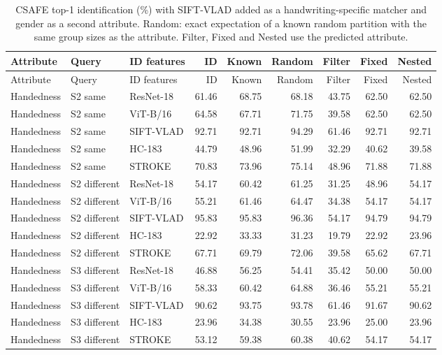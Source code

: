 \begin{longtable}{lllrrrrrr}
\caption{CSAFE top-1 identification (\%) with SIFT-VLAD added as a handwriting-specific matcher and gender as a second attribute. Random: exact expectation of a known random partition with the same group sizes as the attribute. Filter, Fixed and Nested use the predicted attribute.}\label{tab:p2ident}\\
\toprule Attribute & Query & ID features & ID & Known & Random & Filter & Fixed & Nested\\\midrule
\endfirsthead
\toprule Attribute & Query & ID features & ID & Known & Random & Filter & Fixed & Nested\\\midrule
\endhead
Handedness & S2 same & ResNet-18 & 61.46 & 68.75 & 68.18 & 43.75 & 62.50 & 62.50 \\
Handedness & S2 same & ViT-B/16 & 64.58 & 67.71 & 71.75 & 39.58 & 62.50 & 62.50 \\
Handedness & S2 same & SIFT-VLAD & 92.71 & 92.71 & 94.29 & 61.46 & 92.71 & 92.71 \\
Handedness & S2 same & HC-183 & 44.79 & 48.96 & 51.99 & 32.29 & 40.62 & 39.58 \\
Handedness & S2 same & STROKE & 70.83 & 73.96 & 75.14 & 48.96 & 71.88 & 71.88 \\
Handedness & S2 different & ResNet-18 & 54.17 & 60.42 & 61.25 & 31.25 & 48.96 & 54.17 \\
Handedness & S2 different & ViT-B/16 & 55.21 & 61.46 & 64.47 & 34.38 & 54.17 & 54.17 \\
Handedness & S2 different & SIFT-VLAD & 95.83 & 95.83 & 96.36 & 54.17 & 94.79 & 94.79 \\
Handedness & S2 different & HC-183 & 22.92 & 33.33 & 31.23 & 19.79 & 22.92 & 23.96 \\
Handedness & S2 different & STROKE & 67.71 & 69.79 & 72.06 & 39.58 & 65.62 & 67.71 \\
Handedness & S3 different & ResNet-18 & 46.88 & 56.25 & 54.41 & 35.42 & 50.00 & 50.00 \\
Handedness & S3 different & ViT-B/16 & 58.33 & 60.42 & 64.88 & 36.46 & 55.21 & 55.21 \\
Handedness & S3 different & SIFT-VLAD & 90.62 & 93.75 & 93.78 & 61.46 & 91.67 & 90.62 \\
Handedness & S3 different & HC-183 & 23.96 & 34.38 & 30.55 & 23.96 & 25.00 & 23.96 \\
Handedness & S3 different & STROKE & 53.12 & 59.38 & 60.38 & 40.62 & 54.17 & 54.17 \\

\end{longtable}

